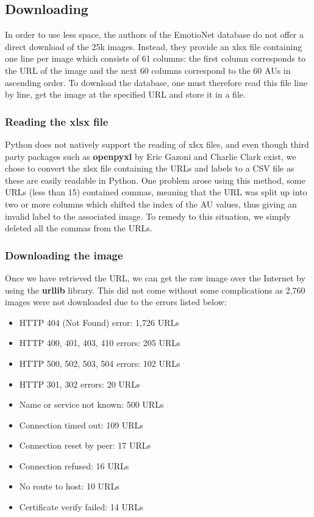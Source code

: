 \documentclass[12pt,twoside]{article}
\begin{document}
\subsection{Downloading}

In order to use less space, the authors of the EmotioNet database do not offer
a direct download of the 25k images. Instead, they provide an xlsx file containing one line per image which consists of 61 columns: the first column corresponds to the URL of the image and the next 60 columns correspond to the 60 AUs in ascending order. To download the database, one must therefore read this file line by line, get the image at the specified URL and store it in a file. 

\subsubsection{Reading the xlsx file}

Python does not natively support the reading of xlsx files, and even though third party packages such as \textbf{openpyxl} by Eric Gazoni and Charlie Clark exist, we chose to convert the xlsx file containing the URLs and labels to a CSV file as these are easily readable in Python. One problem arose using this method, some URLs (less than 15) contained commas, meaning that the URL was split up into two or more columns which shifted the index of the AU values, thus giving an invalid label to the associated image. To remedy to this situation, we simply deleted all the commas from the URLs.

\subsubsection{Downloading the image}

Once we have retrieved the URL, we can get the raw image over the Internet by using the \textbf{urllib} library. This did not come without some complications as 2,760 images were not downloaded due to the errors listed below:

\begin{itemize}
\item HTTP 404 (Not Found) error: 1,726 URLs
\item HTTP 400, 401, 403, 410 errors: 205 URLs
\item HTTP 500, 502, 503, 504 errors: 102 URLs
\item HTTP 301, 302 errors: 20 URLs
\item Name or service not known: 500 URLs
\item Connection timed out: 109 URLs
\item Connection reset by peer: 17 URLs
\item Connection refused: 16 URLs
\item No route to host: 10 URLs
\item Certificate verify failed: 14 URLs
\end{itemize}
\end{document}
